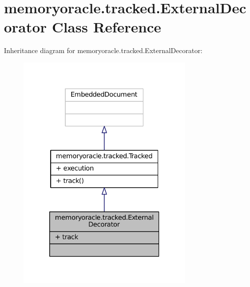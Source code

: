 \hypertarget{classmemoryoracle_1_1tracked_1_1ExternalDecorator}{}\section{memoryoracle.\+tracked.\+External\+Decorator Class Reference}
\label{classmemoryoracle_1_1tracked_1_1ExternalDecorator}


Inheritance diagram for memoryoracle.\+tracked.\+External\+Decorator\+:
\nopagebreak
\begin{figure}[H]
\begin{center}
\leavevmode
\includegraphics[width=247pt]{classmemoryoracle_1_1tracked_1_1ExternalDecorator__inherit__graph}
\end{center}
\end{figure}


